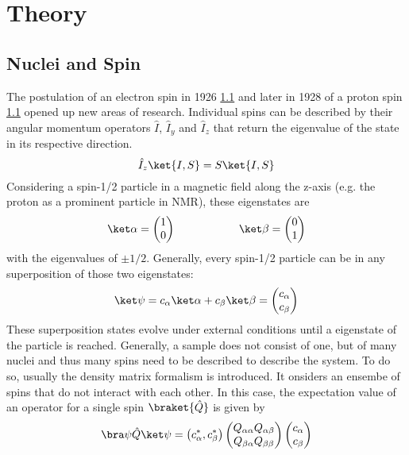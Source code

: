 \chapter{Theory}\label{chap:theory}
	\section{Nuclei and Spin}
	The postulation of an electron spin in 1926 \ref{} and later in 1928 of a proton spin \ref{} opened
	up new areas of research.
	Individual spins can be described by their angular momentum operators $\hat{I}$,
	$\hat{I}_y$ and $\hat{I}_z$ that return the eigenvalue of the state in its respective
	direction.
	\begin{equation}
		\hat I_z \ket{I, S} = S \ket{I,S}
	\end{equation}
	Considering a spin-1/2 particle in a magnetic field along the z-axis (e.g. the proton as a prominent particle in NMR), these
	eigenstates are 
	\begin{equation}
	\ket\alpha = \begin{pmatrix}1\\0\end{pmatrix} \hspace{2 cm} \ket\beta =
	\begin{pmatrix}0\\1\end{pmatrix}
	\end{equation}
	with the eigenvalues of $\pm 1/2$.
	Generally, every spin-1/2 particle can be in any superposition of those two eigenstates:
	\begin{equation}
		\ket\psi = c_\alpha \ket\alpha + c_\beta \ket \beta = \begin{pmatrix} c_\alpha \\
		c_\beta\end{pmatrix}
	\end{equation}
	These superposition states evolve under external conditions until a eigenstate of the particle
	is reached.
	Generally, a sample does not consist of one, but of many nuclei and thus many spins need to be
	described to describe the system. To do so, usually the density matrix formalism is introduced.
	It onsiders an ensembe of spins that do not interact with each other. In this case, the
	expectation value of an operator for a single spin $\braket{\hat Q}$ is given by
	\begin{equation}
	\bra\psi\hat Q\ket\psi = \left( c_\alpha^*, c_\beta^*\right)
	\begin{pmatrix}
		Q_{\alpha\alpha} Q_{\alpha\beta}\\
		Q_{\beta\alpha} Q_{\beta\beta}
	\end{pmatrix}
	\begin{pmatrix}
		c_\alpha\\
		c_\beta
	\end{pmatrix}
	\end{equation}
